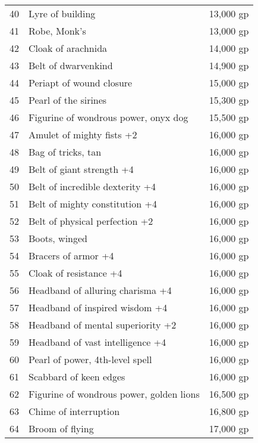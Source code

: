 \begin{table}[]
\begin{tabularx}{\linewidth}{lXl}
40  & Lyre of building                            & 13,000 gp    \\
41  & Robe, Monk's                                & 13,000 gp    \\
42  & Cloak of arachnida                          & 14,000 gp    \\
43  & Belt of dwarvenkind                         & 14,900 gp    \\
44  & Periapt of wound closure                    & 15,000 gp    \\
45  & Pearl of the sirines                        & 15,300 gp    \\
46  & Figurine of wondrous power, onyx dog        & 15,500 gp    \\
47  & Amulet of mighty fists +2                   & 16,000 gp    \\
48  & Bag of tricks, tan                          & 16,000 gp    \\
49  & Belt of giant strength +4                   & 16,000 gp    \\
50  & Belt of incredible dexterity +4             & 16,000 gp    \\
51  & Belt of mighty constitution +4              & 16,000 gp    \\
52  & Belt of physical perfection +2              & 16,000 gp    \\
53  & Boots, winged                               & 16,000 gp    \\
54  & Bracers of armor +4                         & 16,000 gp    \\
55  & Cloak of resistance +4                      & 16,000 gp    \\
56  & Headband of alluring charisma +4            & 16,000 gp    \\
57  & Headband of inspired wisdom +4              & 16,000 gp    \\
58  & Headband of mental superiority +2           & 16,000 gp    \\
59  & Headband of vast intelligence +4            & 16,000 gp    \\
60  & Pearl of power, 4th-level spell             & 16,000 gp    \\
61  & Scabbard of keen edges                      & 16,000 gp    \\
62  & Figurine of wondrous power, golden lions    & 16,500 gp    \\
63  & Chime of interruption                       & 16,800 gp    \\
64  & Broom of flying                             & 17,000 gp    \\

\end{tabularx}
\end{table}
